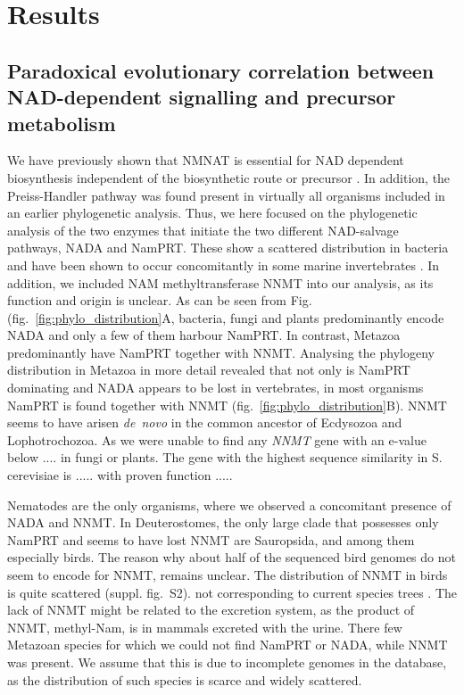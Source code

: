 
\section{Results}

\subsection{Paradoxical evolutionary correlation between NAD-dependent signalling and precursor metabolism}
We have  previously shown  that NMNAT is essential for NAD dependent biosynthesis independent of the biosynthetic route or precursor \cite{PMID:21729004}. In addition, the Preiss-Handler pathway was found  present in virtually all organisms included in an earlier phylogenetic analysis\cite{Gossmann2012FEBS}. Thus, we here focused on the phylogenetic analysis of the two enzymes that initiate the two different NAD-salvage pathways, NADA and NamPRT. These show a scattered distribution in bacteria  and have been shown to occur concomitantly in some marine invertebrates \cite{Gossmann2012FEBS}. In addition, we included  NAM methyltransferase NNMT into our analysis, as its function and origin is unclear. 
As can be seen from Fig. (fig.~\ref{fig:phylo_distribution}A, bacteria, fungi and plants predominantly encode NADA and only a few of them harbour NamPRT.  In contrast, Metazoa predominantly have NamPRT together with NNMT. Analysing the phylogeny distribution in Metazoa in more detail revealed that not only is NamPRT dominating and NADA appears to be lost in vertebrates, in most organisms NamPRT is found together with NNMT (fig.~\ref{fig:phylo_distribution}B). NNMT seems to have arisen \textit{de~novo} in the common ancestor of Ecdysozoa and Lophotrochozoa. As we were unable to find any \textit{NNMT} gene with an e-value below ....   in fungi or plants. The gene with the highest sequence similarity in S. cerevisiae is  ..... with proven function ..... 

Nematodes are the only organisms, where we observed a concomitant presence of NADA and NNMT. In Deuterostomes, the only large clade that possesses only NamPRT and seems to have lost NNMT are Sauropsida, and among them especially birds. The reason why about half of the sequenced bird genomes do not seem to encode for  NNMT,  remains unclear. The distribution of NNMT in birds is quite scattered (suppl. fig.~S2). not corresponding to current species trees \cite{http://dx.doi.org/10.1038/nature15697} . The lack of NNMT might be related to the excretion system, as the product of NNMT, methyl-Nam, is in mammals excreted with the urine. There few Metazoan species for which we could not find NamPRT or NADA, while NNMT was present. We assume that this is due to incomplete genomes in the database, as the distribution of such species is scarce and widely scattered.

